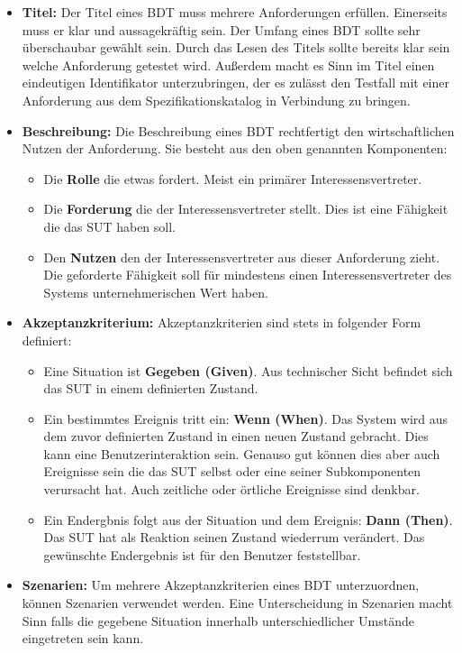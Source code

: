 \begin{itemize}
\item \textbf{Titel:} Der Titel eines \Gls{BDT} muss mehrere Anforderungen erfüllen. Einerseits muss er klar und aussagekräftig sein. Der Umfang eines \Gls{BDT} sollte sehr überschaubar gewählt sein. Durch das Lesen des Titels sollte bereits klar sein welche Anforderung getestet wird. Außerdem macht es Sinn im Titel einen eindeutigen Identifikator unterzubringen, der es zulässt den Testfall mit einer Anforderung aus dem Spezifikationskatalog in Verbindung zu bringen.
\item \textbf{Beschreibung:} Die Beschreibung eines \Gls{BDT} rechtfertigt den wirtschaftlichen Nutzen der Anforderung. Sie besteht aus den oben genannten Komponenten:

\begin{itemize}
\item Die \textbf{Rolle} die etwas fordert. Meist ein primärer Interessensvertreter.
\item Die \textbf{Forderung} die der Interessensvertreter stellt. Dies ist eine Fähigkeit die das \Gls{SUT} haben soll.
\item Den \textbf{Nutzen} den der Interessensvertreter aus dieser Anforderung zieht. Die geforderte Fähigkeit soll für mindestens einen Interessensvertreter des Systems unternehmerischen Wert haben.
\end{itemize}

\item \textbf{Akzeptanzkriterium:} Akzeptanzkriterien sind stets in folgender Form definiert:
\begin{itemize}
\item Eine Situation ist \textbf{Gegeben (Given)}. Aus technischer Sicht befindet sich das \Gls{SUT} in einem definierten Zustand.
\item Ein bestimmtes Ereignis tritt ein: \textbf{Wenn (When)}. Das System wird aus dem zuvor definierten Zustand in einen neuen Zustand gebracht. Dies kann eine Benutzerinteraktion sein. Genauso gut können dies aber auch Ereignisse sein die das \Gls{SUT} selbst oder eine seiner Subkomponenten verursacht hat. Auch zeitliche oder örtliche Ereignisse sind denkbar.
\item Ein Endergbnis folgt aus der Situation und dem Ereignis: \textbf{Dann (Then)}. Das \Gls{SUT} hat als Reaktion seinen Zustand wiederrum verändert. Das gewünschte Endergebnis ist für den Benutzer feststellbar.
\end{itemize}

\item \textbf{Szenarien:} Um mehrere Akzeptanzkriterien eines \Gls{BDT} unterzuordnen, können Szenarien verwendet werden. Eine Unterscheidung in Szenarien macht Sinn falls die gegebene Situation innerhalb unterschiedlicher Umstände eingetreten sein kann.
\end{itemize}

